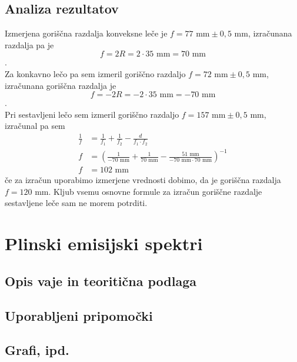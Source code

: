 \documentclass[12pt]{article}
\begin{document}
    \subsection*{Analiza rezultatov}
    Izmerjena goriščna razdalja konveksne leče je $f = 77 \text{ mm} \pm 0,5 \text{ mm}$,
    izračunana razdalja pa je 
    \begin{equation}
        f = 2R = 2 \cdot 35 \text{ mm} = 70 \text{ mm}
    \end{equation}.\\
    Za konkavno lečo pa sem izmeril goriščno razdaljo $f = 72 \text{ mm} \pm 0,5 \text{ mm}$, 
    izračunana goriščna razdalja je 
    \begin{equation}
        f = -2R = -2 \cdot 35 \text{ mm} = -70 \text{ mm}
    \end{equation}.\\
    Pri sestavljeni lečo sem izmeril goriščno razdaljo $f = 157 \text{ mm} \pm 0,5 \text{ mm}$,
    izračunal pa sem
    \begin{equation}
        \begin{split}
            \frac{1}{f} &= \frac{1}{f_1} + \frac{1}{f_2} - \frac{d}{f_1 \cdot f_2} \\
            f &= (\frac{1}{-70 \text{ mm}} + \frac{1}{70 \text{ mm}} - \frac{51 \text{ mm}}{-70 \text{ mm} \cdot 70 \text{ mm}})^{-1}\\
            f &= 102 \text{ mm}
        \end{split}
    \end{equation}
    če za izračun uporabimo izmerjene vrednosti dobimo, da je goriščna razdalja $f = 120 \text{ mm}$.
    Kljub vsemu osnovne formule za izračun goriščne razdalje sestavljene leče sam ne morem
    potrditi.


\newpage
\section{Plinski emisijski spektri}
    \subsection*{Opis vaje in teoritična podlaga}
    \subsection*{Uporabljeni pripomočki}
    \subsection*{Grafi, ipd.}
\end{document}
